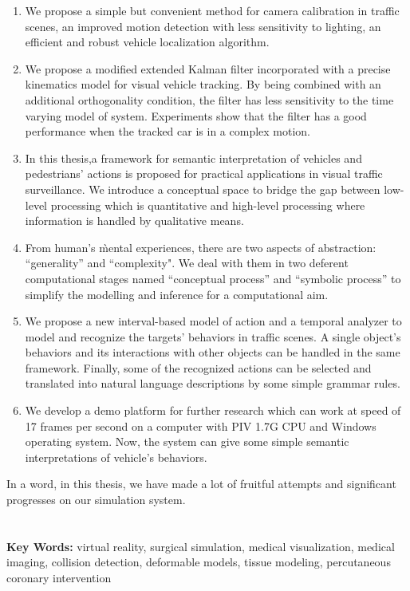 \begin{enumerate}
    \item We propose a simple but convenient method for camera calibration in
    traffic scenes, an improved motion detection with less sensitivity to lighting,
    an efficient and robust vehicle localization algorithm.
    \item We propose a modified extended Kalman filter incorporated with a precise
    kinematics model for visual vehicle tracking. By being combined with an additional orthogonality
    condition, the filter has less sensitivity to the time varying model of system. Experiments
    show that the filter has a good performance when the tracked car is in a complex motion.
    \item In this thesis,a framework for semantic interpretation of vehicles and pedestrians'
    actions is proposed for practical applications in visual traffic surveillance.  We introduce
    a conceptual space to bridge the gap between low-level processing which is quantitative
    and high-level processing where information is handled by qualitative means.
    \item From human's \`mental experiences, there are two aspects of abstraction: ``generality'' and
    ``complexity". We deal with them in two deferent computational stages named ``conceptual process'' and ``symbolic process'' to
    simplify the modelling and inference for a computational aim.
    \item We propose a new interval-based model of action and a temporal analyzer to model and
    recognize the targets' behaviors in traffic scenes. A single object's behaviors and its
    interactions with other objects can be handled in the same framework. Finally, some of the recognized
    actions can be selected and translated into natural language descriptions by some simple grammar
    rules.
    \item We develop a demo platform for further research which can work at
    speed of 17 frames per second on a computer with PIV 1.7G CPU and Windows
    operating system. Now, the system can give some simple semantic interpretations
    of vehicle's behaviors.
\end{enumerate}

In a word, in this thesis, we have made a lot of fruitful attempts and significant
progresses on our simulation system.
\\
\\
\\
\noindent \textbf{Key Words:} virtual reality, surgical simulation, medical
visualization, medical imaging, collision detection, deformable models, tissue modeling, 
percutaneous coronary intervention
